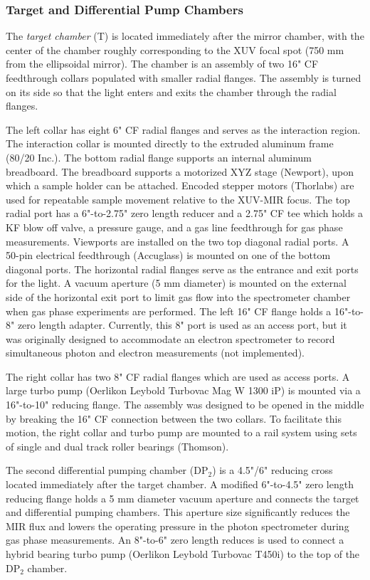\subsubsection{Target and  Differential Pump Chambers}

The \textit{target chamber} (T) is located immediately after the mirror chamber, with the center of the chamber roughly corresponding to the XUV focal spot (750 mm from the ellipsoidal mirror). The chamber is an assembly of two 16" CF feedthrough collars populated with smaller radial flanges. The assembly is turned on its side so that the light enters and exits the chamber through the radial flanges.

The left collar has eight 6" CF radial flanges and serves as the interaction region. The interaction collar is mounted directly to the extruded aluminum frame (80/20 Inc.). The bottom radial flange supports an internal aluminum breadboard. The breadboard supports a motorized XYZ stage (Newport), upon which a sample holder can be attached. Encoded stepper motors (Thorlabs) are used for repeatable sample movement relative to the XUV-MIR focus. The top radial port has a 6"-to-2.75" zero length reducer and a 2.75" CF tee which holds a KF blow off valve, a pressure gauge, and a gas line feedthrough for gas phase measurements. Viewports are installed on the two top diagonal radial ports. A 50-pin electrical feedthrough (Accuglass) is mounted on one of the bottom diagonal ports. The horizontal radial flanges serve as the entrance and exit ports for the light. A vacuum aperture (5 mm diameter) is mounted on the external side of the horizontal exit port to limit gas flow into the spectrometer chamber when gas phase experiments are performed. The left 16" CF flange holds a 16"-to-8" zero length adapter. Currently, this 8" port is used as an access port, but it was originally designed to accommodate an electron spectrometer to record simultaneous photon and electron measurements (not implemented).

The right collar has two 8" CF radial flanges which are used as access ports. A large turbo pump (Oerlikon Leybold Turbovac Mag W 1300 iP) is mounted via a 16"-to-10" reducing flange. The assembly was designed to be opened in the middle by breaking the 16" CF connection between the two collars. To facilitate this motion, the right collar and turbo pump are mounted to a rail system using sets of single and dual track roller bearings (Thomson).

The second differential pumping chamber (DP$_2$) is a 4.5"/6" reducing cross located immediately after the target chamber. A modified 6"-to-4.5" zero length reducing flange holds a 5 mm diameter vacuum aperture and connects the target and differential pumping chambers. This aperture size significantly reduces the MIR flux and lowers the operating pressure in the photon spectrometer during gas phase measurements. An 8"-to-6" zero length reduces is used to connect a hybrid bearing turbo pump (Oerlikon Leybold Turbovac T450i) to the top of the DP$_2$ chamber.

